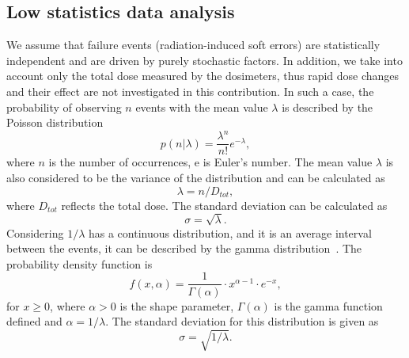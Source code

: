 \subsection{Low statistics data analysis}

We assume that failure events (radiation-induced soft errors) are statistically independent and are driven by purely stochastic factors. In addition, we take into account only the total dose measured by the dosimeters, thus rapid dose changes and their effect are not investigated in this contribution. In such a case, the probability of observing $n$ events with the mean value $\lambda$ is described by the Poisson distribution~\cite{Gamma_1}\newline
\begin{equation}
    p(n|\lambda) = \frac{\lambda^{n}}{n!}e^{-\lambda},
\end{equation}
where $n$ is the number of occurrences, e is Euler's number. The mean value $\lambda$ is also considered to be the variance of the distribution and can be calculated as
\begin{equation}
    \lambda = n/D_{tot},
\end{equation}
where $D_{tot}$ reflects the total dose. The standard deviation can be calculated as 
\begin{equation}
    \sigma = \sqrt{\lambda}.
\end{equation}
Considering $1/\lambda$ has a continuous distribution, and it is an average interval between the events, it can be described by the gamma distribution~\cite{Gamma_1, Gamma_2}. The probability density function is 
\begin{equation}
   f(x, \alpha) = \frac{1}{{\Gamma(\alpha)}} \cdot x^{\alpha-1} \cdot e^{-x},
\end{equation}
for $x \geq 0$, where $\alpha > 0$ is the shape parameter, $\Gamma(\alpha)$ is the gamma function defined and $\alpha = 1/\lambda$. The standard deviation for this distribution is given as
\begin{equation}
    \sigma = \sqrt{1/\lambda}.
\end{equation}

